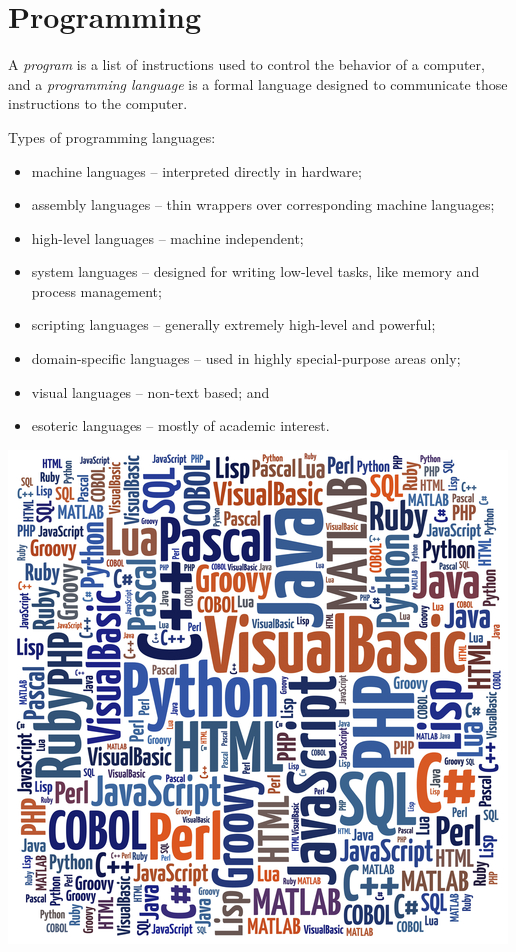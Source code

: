\documentclass[8pt,a4paper,compress,handout]{beamer}
\begin{document}
\section{Programming}
\begin{frame}[fragile]
A \emph{program} is a list of instructions used to control the behavior of a computer, and a \emph{programming language} is a formal language designed to communicate those instructions to the computer.

\bigskip

\begin{minipage}{200pt}
Types of programming languages:
\begin{itemize}
\item machine languages -- interpreted directly in hardware; 
\item assembly languages -- thin wrappers over corresponding machine languages; 
\item high-level languages -- machine independent; 
\item system languages -- designed for writing low-level tasks, like memory and process management; 
\item scripting languages -- generally extremely high-level and powerful; 
\item domain-specific languages -- used in highly special-purpose areas only; 
\item visual languages -- non-text based; and
\item esoteric languages -- mostly of academic interest.
\end{itemize}
\end{minipage}\hfill %
\begin{minipage}{100pt}
\begin{center}
\includegraphics[scale=0.9]{figures/programming_languages.jpg}


\end{center}
\end{minipage}
\end{frame}
\end{document}
